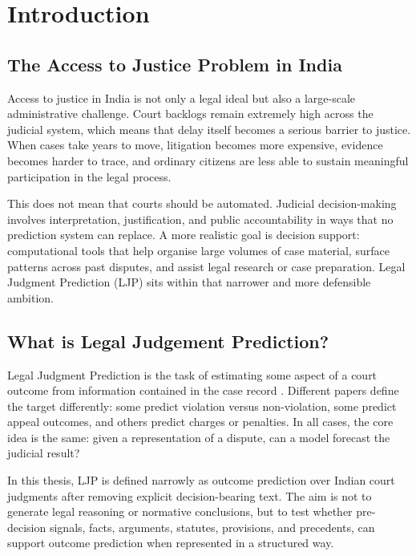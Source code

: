 \chapter{Introduction}

\section{The Access to Justice Problem in India}

Access to justice in India is not only a legal ideal but also a large-scale administrative challenge. Court backlogs remain extremely high across the judicial system, which means that delay itself becomes a serious barrier to justice. When cases take years to move, litigation becomes more expensive, evidence becomes harder to trace, and ordinary citizens are less able to sustain meaningful participation in the legal process.

This does not mean that courts should be automated. Judicial decision-making involves interpretation, justification, and public accountability in ways that no prediction system can replace. A more realistic goal is decision support: computational tools that help organise large volumes of case material, surface patterns across past disputes, and assist legal research or case preparation. Legal Judgment Prediction (LJP) sits within that narrower and more defensible ambition.

\section{What is Legal Judgement Prediction?}

Legal Judgment Prediction is the task of estimating some aspect of a court outcome from information contained in the case record \cite{aletras2016echr, katz2017supreme, medvedeva2020echr}. Different papers define the target differently: some predict violation versus non-violation, some predict appeal outcomes, and others predict charges or penalties. In all cases, the core idea is the same: given a representation of a dispute, can a model forecast the judicial result?

In this thesis, LJP is defined narrowly as outcome prediction over Indian court judgments after removing explicit decision-bearing text. The aim is not to generate legal reasoning or normative conclusions, but to test whether pre-decision signals, facts, arguments, statutes, provisions, and precedents, can support outcome prediction when represented in a structured way.

